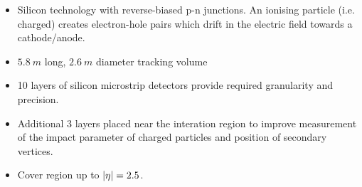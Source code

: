     \begin{itemize}
        \item Silicon technology with reverse-biased p-n junctions. An ionising
            particle (i.e. charged) creates electron-hole pairs which drift in the
            electric field towards a cathode/anode.
        \item ${\SI{5.8}{m}}$ long, ${\SI{2.6}{m}}$ diameter tracking volume
        \item 10 layers of silicon microstrip detectors provide required granularity
        and precision.
    \item Additional 3 layers placed near the interation region to improve
        measurement of the impact parameter of charged particles and position
        of secondary vertices.
    \item Cover region up to ${|\eta|=2.5}$.
\end{itemize}

\subsection{\ECAL}

